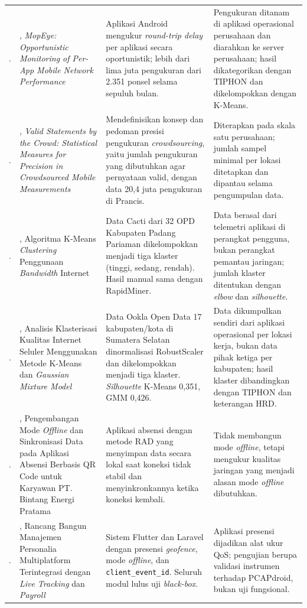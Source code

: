 {\begin{longtable}{>{\centering\arraybackslash}p{0.8cm}>{\raggedright\arraybackslash}p{3.7cm}>{\raggedright\arraybackslash}p{4.2cm}>{\raggedright\arraybackslash}p{3.89cm}}
5. & \textcite{wu2017mopeye}, \textit{MopEye: Opportunistic Monitoring of Per-App Mobile Network Performance} & Aplikasi Android mengukur \textit{round-trip delay} per aplikasi secara oportunistik; lebih dari lima juta pengukuran dari 2.351 ponsel selama sepuluh bulan. & Pengukuran ditanam di aplikasi operasional perusahaan dan diarahkan ke server perusahaan; hasil dikategorikan dengan TIPHON dan dikelompokkan dengan K-Means. \\ \garis
6. & \textcite{wamser2021crowd}, \textit{Valid Statements by the Crowd: Statistical Measures for Precision in Crowdsourced Mobile Measurements} & Mendefinisikan konsep dan pedoman presisi pengukuran \textit{crowdsourcing}, yaitu jumlah pengukuran yang dibutuhkan agar pernyataan valid, dengan data 20,4 juta pengukuran di Prancis. & Diterapkan pada skala satu perusahaan; jumlah sampel minimal per lokasi ditetapkan dan dipantau selama pengumpulan data. \\ \garis
7. & \textcite{mubarak2023kmeans}, Algoritma K-Means \textit{Clustering} Penggunaan \textit{Bandwidth} Internet & Data Cacti dari 32 OPD Kabupaten Padang Pariaman dikelompokkan menjadi tiga klaster (tinggi, sedang, rendah). Hasil manual sama dengan RapidMiner. & Data berasal dari telemetri aplikasi di perangkat pengguna, bukan perangkat pemantau jaringan; jumlah klaster ditentukan dengan \textit{elbow} dan \textit{silhouette}. \\ \garis
8. & \textcite{irwansyah2025kmeans}, Analisis Klasterisasi Kualitas Internet Seluler Menggunakan Metode K-Means dan \textit{Gaussian Mixture Model} & Data Ookla Open Data 17 kabupaten/kota di Sumatera Selatan dinormalisasi RobustScaler dan dikelompokkan menjadi tiga klaster. \textit{Silhouette} K-Means 0,351, GMM 0,426. & Data dikumpulkan sendiri dari aplikasi operasional per lokasi kerja, bukan data pihak ketiga per kabupaten; hasil klaster dibandingkan dengan TIPHON dan keterangan HRD. \\ \garis
9. & \textcite{indah2025offline}, Pengembangan Mode \textit{Offline} dan Sinkronisasi Data pada Aplikasi Absensi Berbasis QR Code untuk Karyawan PT. Bintang Energi Pratama & Aplikasi absensi dengan metode RAD yang menyimpan data secara lokal saat koneksi tidak stabil dan menyinkronkannya ketika koneksi kembali. & Tidak membangun mode \textit{offline}, tetapi mengukur kualitas jaringan yang menjadi alasan mode \textit{offline} dibutuhkan. \\ \garis
10. & \textcite{rokhman2026personalia}, Rancang Bangun Manajemen Personalia Multiplatform Terintegrasi dengan \textit{Live Tracking} dan \textit{Payroll} & Sistem Flutter dan Laravel dengan presensi \textit{geofence}, mode \textit{offline}, dan \texttt{client\_event\_id}. Seluruh modul lulus uji \textit{black-box}. & Aplikasi presensi dijadikan alat ukur QoS; pengujian berupa validasi instrumen terhadap PCAPdroid, bukan uji fungsional. \\
\end{longtable}
}
